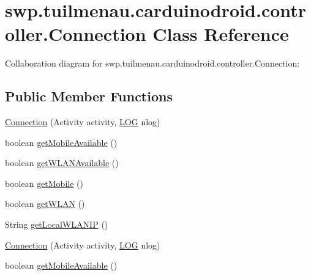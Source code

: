 \hypertarget{classswp_1_1tuilmenau_1_1carduinodroid_1_1controller_1_1_connection}{}\section{swp.\+tuilmenau.\+carduinodroid.\+controller.\+Connection Class Reference}
\label{classswp_1_1tuilmenau_1_1carduinodroid_1_1controller_1_1_connection}


Collaboration diagram for swp.\+tuilmenau.\+carduinodroid.\+controller.\+Connection\+:
\subsection*{Public Member Functions}
\begin{DoxyCompactItemize}
\item 
\hyperlink{classswp_1_1tuilmenau_1_1carduinodroid_1_1controller_1_1_connection_a34bd7c0e4a3a6178864064c97c076adf}{Connection} (Activity activity, \hyperlink{classswp_1_1tuilmenau_1_1carduinodroid_1_1model_1_1_l_o_g}{L\+O\+G} nlog)
\item 
boolean \hyperlink{classswp_1_1tuilmenau_1_1carduinodroid_1_1controller_1_1_connection_ae308ed26606956a787a4b61d3fe7e7a0}{get\+Mobile\+Available} ()
\item 
boolean \hyperlink{classswp_1_1tuilmenau_1_1carduinodroid_1_1controller_1_1_connection_a960f3033213736a2ca426a478ad85a3c}{get\+W\+L\+A\+N\+Available} ()
\item 
boolean \hyperlink{classswp_1_1tuilmenau_1_1carduinodroid_1_1controller_1_1_connection_a3ea65267df8d63ec6a67e511067a674c}{get\+Mobile} ()
\item 
boolean \hyperlink{classswp_1_1tuilmenau_1_1carduinodroid_1_1controller_1_1_connection_acc74178e090418a8ae95b2f2840cf06e}{get\+W\+L\+A\+N} ()
\item 
String \hyperlink{classswp_1_1tuilmenau_1_1carduinodroid_1_1controller_1_1_connection_a478434825ab767b5bf14834a1062abb3}{get\+Local\+W\+L\+A\+N\+I\+P} ()
\item 
\hyperlink{classswp_1_1tuilmenau_1_1carduinodroid_1_1controller_1_1_connection_a34bd7c0e4a3a6178864064c97c076adf}{Connection} (Activity activity, \hyperlink{classswp_1_1tuilmenau_1_1carduinodroid_1_1model_1_1_l_o_g}{L\+O\+G} nlog)
\item 
boolean \hyperlink{classswp_1_1tuilmenau_1_1carduinodroid_1_1controller_1_1_connection_ae308ed26606956a787a4b61d3fe7e7a0}{get\+Mobile\+Available} ()

\end{DoxyCompactItemize}
